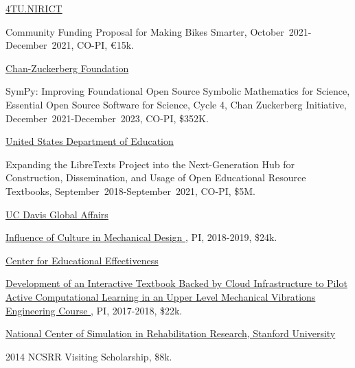 \documentclass[10pt]{article}
\newenvironment{innerlist}[1][\enskip\textbullet]%
        {\begin{compactitem}[#1]}{\end{compactitem}}
\newcommand{\blankline}{\quad\pagebreak[2]}
\begin{document}
\blankline

\href{https://www.4tu.nl/nirict}{4TU.NIRICT}
\begin{innerlist}
\item Community Funding Proposal for Making Bikes Smarter,
  October~2021-December~2021, CO-PI, \euro15k.
\end{innerlist}

\blankline

\href{https://www.chanzuckerberg.com}{Chan-Zuckerberg Foundation}
\begin{innerlist}
  \item SymPy: Improving Foundational Open Source Symbolic Mathematics for
    Science, Essential Open Source Software for Science, Cycle 4, Chan
    Zuckerberg Initiative, December~2021-December~2023, CO-PI, \$352K.
\end{innerlist}

\blankline

\href{https://www.ed.gov}{United States Department of Education}
\begin{innerlist}
\item Expanding the LibreTexts Project into the Next-Generation Hub for
  Construction, Dissemination, and Usage of Open Educational Resource
  Textbooks, September~2018-September~2021, CO-PI, \$5M.
\end{innerlist}

\blankline

\href{https://globalaffairs.ucdavis.edu}{UC Davis Global Affairs}
\begin{innerlist}
\item \href{https://doi.org/10.6084/m9.figshare.5656105}{
      Influence of Culture in Mechanical Design
    }, PI, 2018-2019, \$24k.
\end{innerlist}

\blankline

\href{http://cee.ucdavis.edu/}{Center for Educational Effectiveness}
\begin{innerlist}
\item \href{https://doi.org/10.6084/m9.figshare.5229886.v1}{
      Development of an Interactive Textbook Backed by Cloud Infrastructure to
      Pilot Active Computational Learning in an Upper Level Mechanical
      Vibrations Engineering Course
    }, PI, 2017-2018, \$22k.
\end{innerlist}

\blankline

\href{http://opensim.stanford.edu/}{National Center of Simulation in
  Rehabilitation Research, Stanford University}
\begin{innerlist}
  \item 2014 NCSRR Visiting Scholarship, \$8k.
\end{innerlist}
\end{document}
